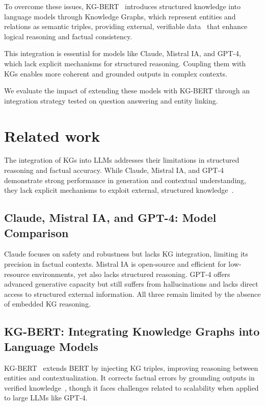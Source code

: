 \documentclass[conference]{IEEEtran}
\begin{document}
To overcome these issues, KG-BERT~\cite{yao2019} introduces structured knowledge into language models through Knowledge Graphs, which represent entities and relations as semantic triples, providing external, verifiable data~\cite{ji2021} that enhance logical reasoning and factual consistency.

This integration is essential for models like Claude, Mistral IA, and GPT-4, which lack explicit mechanisms for structured reasoning. Coupling them with KGs enables more coherent and grounded outputs in complex contexts.

We evaluate the impact of extending these models with KG-BERT through an integration strategy tested on question answering and entity linking.


\section{Related work}
\label{sec:RW}

The integration of KGs into LLMs addresses their limitations in structured reasoning and factual accuracy. While Claude, Mistral IA, and GPT-4~\cite{anthropic2023,mistral2023,openai2023} demonstrate strong performance in generation and contextual understanding, they lack explicit mechanisms to exploit external, structured knowledge~\cite{zellers2019}.

\subsection{Claude, Mistral IA, and GPT-4: Model Comparison}

Claude focuses on safety and robustness but lacks KG integration, limiting its precision in factual contexts. Mistral IA is open-source and efficient for low-resource environments, yet also lacks structured reasoning. GPT-4 offers advanced generative capacity but still suffers from hallucinations and lacks direct access to structured external information. All three remain limited by the absence of embedded KG reasoning.

\subsection{KG-BERT: Integrating Knowledge Graphs into Language Models}

KG-BERT~\cite{yao2019} extends BERT by injecting KG triples, improving reasoning between entities and contextualization. It corrects factual errors by grounding outputs in verified knowledge~\cite{ji2021}, though it faces challenges related to scalability when applied to large LLMs like GPT-4.
\end{document}
